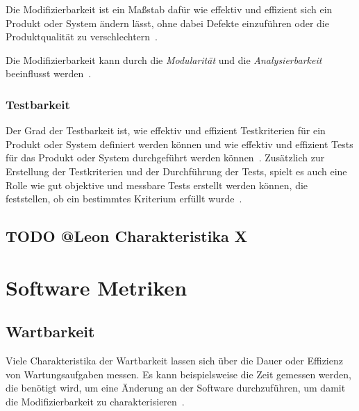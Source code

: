 \documentclass[12pt, a4paper, ngerman]{article}
\begin{document}
Die Modifizierbarkeit ist ein Maßstab dafür wie effektiv und effizient sich ein Produkt oder System
ändern lässt, ohne dabei Defekte einzuführen oder die Produktqualität zu verschlechtern~\cite{ISO25010}.

Die Modifizierbarkeit kann durch die \emph{Modularität} und die \emph{Analysierbarkeit} beeinflusst werden~\cite{ISO25010}.

\subsubsection{Testbarkeit}

Der Grad der Testbarkeit ist,
wie effektiv und effizient Testkriterien für ein Produkt oder System definiert werden können
und wie effektiv und effizient Tests für das Produkt oder System durchgeführt werden können~\cite{ISO25010}.
Zusätzlich zur Erstellung der Testkriterien und der Durchführung der Tests,
spielt es auch eine Rolle wie gut objektive und messbare Tests erstellt werden können,
die feststellen, ob ein bestimmtes Kriterium erfüllt wurde~\cite{IEEE24765}.

\subsection{TODO @Leon Charakteristika X}


\section{Software Metriken}


\subsection{Wartbarkeit}

Viele Charakteristika der Wartbarkeit lassen sich über die Dauer oder Effizienz von Wartungsaufgaben messen.
Es kann beispielsweise die Zeit gemessen werden, die benötigt wird,
um eine Änderung an der Software durchzuführen,
um damit die Modifizierbarkeit zu charakterisieren~\cite{maintainability_metrics}.%
\end{document}
